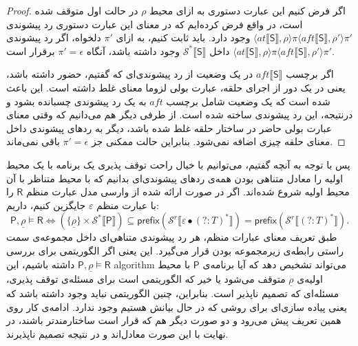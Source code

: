 \begin{proof}
اگر فرض کنیم این عبارت‌ دستوری به ازای محیط $\rho$ در حالت اول متوقف شده است، در واقع فرض کرده‌ایم که در معنای این عبارت‌ دستوری رد پیشوندی 
$\langle at \llbracket \mathsf{S} \rrbracket , \rho \rangle \pi \langle aft \llbracket \mathsf{S} \rrbracket , \rho' \rangle \pi'$ 
وجود دارد.
باید ثابت کنیم، به ازای $\pi'$ دلخواه، اگر رد پیشوندی
$\langle at \llbracket \mathsf{S} \rrbracket , \rho \rangle \pi \langle aft \llbracket \mathsf{S} \rrbracket , \rho' \rangle \pi'$ 
داخل 
$\mathcal{S^*}\llbracket \mathsf{S} \rrbracket$
وجود داشته باشد، آنگاه
$\pi'=\epsilon$
برقرار است.

اگر برچسب
$aft \llbracket \mathsf{S} \rrbracket$
در یک وضعیت از رد پیشوندی‌ای که گفتیم، حضور داشته باشد، یعنی در یک دور از اجرای حلقه، عبارت بولی لزوما معنای غلط داشته است. این باعث شده است که یک وضعیت شامل برچسب $aft$ به یک رد پیشوندی چسبانده بشود و درنتیجه، این رد پیشوندی ساخته شده است. از طرفی دیگر هم می‌دانیم که وقتی معنای عبارت بولی حاضر در ساختار حلقه غلط شده باشد، دیگر به ردهای پیشوندی داخل معنای حلقه چیزی اضافه نمی‌شود. بنابراین حالت ممکنی جز $\pi'=\epsilon$ باقی نمی‌ماند. 
\end{proof}

پس با توجه به آنچه گفتیم، می‌توانیم با خیال راحت توقف پذیری یک برنامه با یک محیط اولیه را معادل متناهی بودن همه‌ی ردهای پیشوندی‌ای بدانیم که با محیط متناظر با آن محیط اولیه شروع شده‌اند.
اگر در صورت ارائه شده از وارسی مدل عبارت منظم $\mathsf{R}$ را با عبارت منظم $\varepsilon$ جایگزین کنیم، داریم:
$$\mathsf{P},\underline{\rho} \models \mathsf{R}
\Leftrightarrow
(\{\underline{\rho}\}\times \mathcal{S}^* \llbracket \mathsf{P}\rrbracket) \subseteq 
\mathsf{prefix} (\mathcal{S}^r \llbracket \varepsilon \bullet (?:\mathit{T})^*\rrbracket)
=\mathsf{prefix} (\mathcal{S}^r \llbracket (?:\mathit{T})^*\rrbracket).$$
طبق تعریف معنای عبارات منظم، هر رد پیشوندی متناهی‌ای داخل مجموعه‌ی سمت راستی رابطه‌ی زیرمجموعه بودن قرار می‌گیرد. این یعنی اگر الگوریتمی برای بررسی 
$\mathsf{P} , \underline{\rho} \models \mathsf{R} $
داشته باشیم، این \gls*{algorithm} می‌تواند تشخیص دهد که آیا برنامه‌ی $\mathsf{P}$ با محیط اولیه‌ی $\underline{\rho}$ متوقف می‌شود یا خیر که الگوریتمی است برای مسئله‌ی توقف پذیری، مسئله‌ای که تصمیم ناپذیر است. بنابراین، چنین الگوریتمی نباید وجود داشته باشد که یعنی پیاده سازی‌ای برای روشی که در حال بیانش هستیم وجود ندارد. ادامه‌ی کار روی همین تعریف پیش می‌رود و دو صورت دیگر هم که قرار است ساختارمندتر باشند، در نهایت با این صورت معادل‌اند و در نتیجه تصمیم ناپذیرند.













